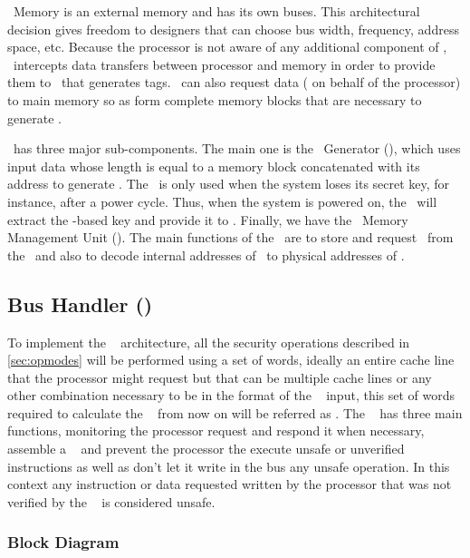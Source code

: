 \ptag~Memory is an external memory and has its own buses. This architectural decision gives freedom to designers that can choose bus width, frequency, address space, etc. Because the processor is not aware of any additional component of \cshia, \handler~intercepts data transfers between processor and memory in order to provide them to \seceng~that generates tags. \handler~can also request data ( on behalf of the processor) to main memory so as form complete memory blocks that are necessary to generate \ptags.

\seceng~has three major sub-components. The main one is the \ptag~Generator (\ptaggen), which uses input data whose length is equal to a memory block concatenated with its address to generate \ptags. The \fuzzy~is only used when the system loses its secret key, for instance, after a power cycle. Thus, when the system is powered on, the \fuzzy~will extract the \puf-based key and provide it to \ptaggen. Finally, we have the \ptag~Memory Management Unit (\pmmu). The main functions of the \pmmu~are to store and request \ptags~from the \ptagmem~and also to decode internal addresses of \ptags~to physical addresses of \ptagmem. 


\subsection{Bus Handler (\handler)}
\label{subsec:bushandler}
To implement the \cshia~ architecture, all the security operations described in \ref{sec:opmodes} will be performed using a set of words, ideally an entire cache line that the processor might request but that can be multiple cache lines or any other combination necessary to be in the format of the \seceng~ input, this set of words required to calculate the \ptags~ from now on will be referred as \sline.  The \handler~ has three main functions, monitoring the processor request and respond it when necessary, assemble a \sline~  and prevent the processor the execute unsafe or unverified instructions  as well as don't let  it  write in the bus any unsafe operation. In this context any instruction or data requested written by the processor that was not verified by the \seceng~ is considered unsafe.



\subsubsection{Block Diagram}

